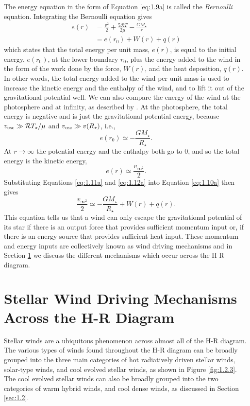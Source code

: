 The energy equation in the form of Equation \ref{eq:1.9a} is called the \textit{Bernoulli} equation. Integrating the Bernoulli equation gives
\begin{align}\label{eq:1.10a}
 e(r) &= \frac{v^2}{2} + \frac{5\mathcal{R}T}{2\mu}-\frac{GM_{\star}}{r} \nonumber \\
 & {} =e(r_{0}) + W(r) + q(r)
\end{align}
which states that the total energy per unit mass, $e(r)$, is equal to the initial energy, $e(r_{0})$, at the lower boundary $r_{0}$, plus the energy added to the wind in the form of the work done by the force, $W(r)$, and the heat deposition, $q(r)$. In other words, the total energy added to the wind per unit mass is used to increase the kinetic energy and the enthalpy of the wind, and to lift it out of the gravitational potential well. We can also compare the energy of the wind at the photosphere and at infinity, as described by \cite{lamers_1998}. At the photosphere, the total energy is negative and is just the gravitational potential energy, because $v_{\rm{esc}} \gg \mathcal{R}T_{\star}/\mu$ and  $v_{\rm{esc}} \gg v(R_{\star})$, i.e.,
\begin{equation}\label{eq:1.11a} 
e(r_{0}) \simeq -\frac{GM_{\star}}{R_{\star}}.
\end{equation}
At $r\rightarrow \infty$ the potential energy and the enthalpy both go to 0, and so the total energy is the kinetic energy,
\begin{equation}\label{eq:1.12a} 
e(r) \simeq \frac{v_{\infty ^2}}{2}.
\end{equation}
Substituting Equations \ref{eq:1.11a} and \ref{eq:1.12a} into Equation \ref{eq:1.10a} then gives
\begin{equation}
\frac{v_{\infty ^2}}{2} \simeq -\frac{GM_{\star}}{R_{\star}} + W(r) + q(r).
\end{equation}
This equation tells us that a wind can only escape the gravitational potential of its star if there is an output force that provides sufficient momentum input or, if there is an energy source that provides sufficient heat input. These momentum and energy inputs are collectively known as wind driving mechanisms and in Section \ref{sec:1.4} we discuss the different mechanisms which occur across the H-R diagram.

\section{Stellar Wind Driving Mechanisms Across the H-R Diagram}\label{sec:1.4}
Stellar winds are a ubiquitous phenomenon across almost all of the H-R diagram. The various types of winds found throughout the H-R diagram can be broadly grouped into the three main categories of hot radiatively driven stellar winds, solar-type winds, and cool evolved stellar winds, as shown in Figure \ref{fig:1.2.3}. The cool evolved stellar winds can also be broadly grouped into the two categories of warm hybrid winds, and cool dense winds, as discussed in Section \ref{sec:1.2}. 

